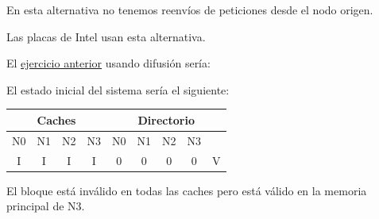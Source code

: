 \documentclass[10pt,a4paper,spanish]{report}
\begin{document}
En esta alternativa no tenemos reenvíos de peticiones desde el nodo origen.

Las placas de Intel usan esta alternativa.

El \hyperref[ej_no_dif]{ejercicio anterior} usando difusión sería:

El estado inicial del sistema sería el siguiente:

\begin{center}
\begin{tabular}{|c|c|c|c|c|c|c|c|c|}
\hline
\multicolumn{4}{|c|}{Caches} & \multicolumn{5}{|c|}{Directorio} \\
\hline
N0 & N1 & N2 & N3 & N0 & N1 & N2 & N3 & \\
\hline
I & I & I & I & 0 & 0 & 0 & 0 & V \\
\hline
\end{tabular}
\end{center}

El bloque está inválido en todas las caches pero está válido en la memoria principal de N3.
\end{document}
